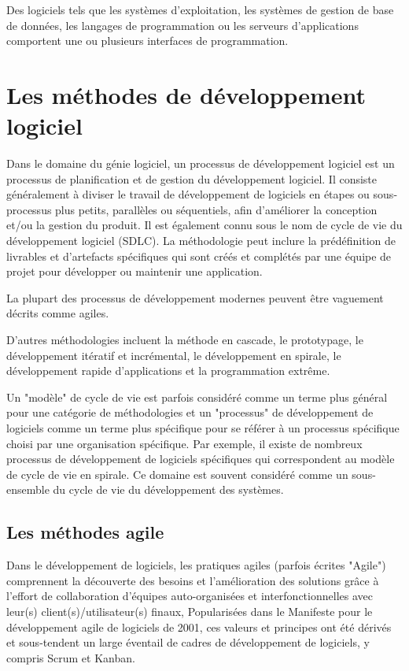 Des logiciels tels que les systèmes d'exploitation, les systèmes de gestion de base de données,
les langages de programmation ou les serveurs d'applications comportent une ou plusieurs
interfaces de programmation.

\section{Les méthodes de développement logiciel}\label{sec:methode-de-developpement-logiciel}
Dans le domaine du génie logiciel, un processus de développement logiciel\cite{software_development_process} est un processus de
planification et de gestion du développement logiciel. Il consiste généralement à diviser
le travail de développement de logiciels en étapes ou sous-processus plus petits, parallèles ou
séquentiels, afin d'améliorer la conception et/ou la gestion du produit. Il est également
connu sous le nom de cycle de vie du développement logiciel (SDLC). La méthodologie peut inclure
la prédéfinition de livrables et d'artefacts spécifiques qui sont créés et complétés par une équipe
de projet pour développer ou maintenir une application.

La plupart des processus de développement modernes peuvent être vaguement décrits comme agiles.

D'autres méthodologies incluent la méthode en cascade, le prototypage, le développement itératif et
incrémental, le développement en spirale, le développement rapide d'applications et la programmation
extrême.

Un "modèle" de cycle de vie est parfois considéré comme un terme plus général pour une catégorie
de méthodologies et un "processus" de développement de logiciels comme un terme plus spécifique
pour se référer à un processus spécifique choisi par une organisation spécifique. Par exemple,
il existe de nombreux processus de développement de logiciels spécifiques qui correspondent au
modèle de cycle de vie en spirale. Ce domaine est souvent considéré comme un sous-ensemble du cycle
de vie du développement des systèmes.

\subsection{Les méthodes agile}\label{subsec:methodes-agiles}
Dans le développement de logiciels, les pratiques agiles\cite{agile_software_development} (parfois écrites "Agile") comprennent
la découverte des besoins et l'amélioration des solutions grâce à l'effort de collaboration
d'équipes auto-organisées et interfonctionnelles avec leur(s) client(s)/utilisateur(s) finaux,
Popularisées dans le Manifeste pour le développement agile de logiciels de 2001, ces valeurs et
principes ont été dérivés et sous-tendent un large éventail de cadres de développement de logiciels,
y compris Scrum et Kanban.

